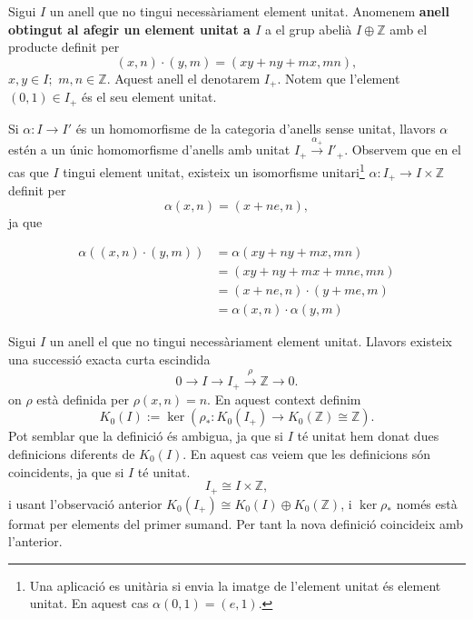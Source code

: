 \begin{definition}
Sigui $I$ un anell que no tingui necessàriament element unitat. Anomenem \textbf{anell obtingut al afegir un element unitat a $I$} a el grup abelià $I \oplus \mathbb{Z}$ amb el producte definit per 
$$
(x,n)\cdot (y,m) = (xy+ny+mx, mn),
$$
$x,y \in I;$ $m,n\in \mathbb{Z}$. Aquest anell el denotarem $I_+$. Notem que l'element $(0,1)\in I_+$ és el seu element unitat.
\end{definition}

\begin{obs}

Si $\alpha :  I \rightarrow I'$ és un homomorfisme de la categoria d'anells sense unitat, llavors $\alpha$ estén a un únic homomorfisme d'anells amb unitat $I_+ \xrightarrow{\alpha_+}I'_+$. 
Observem que en el cas que $I$ tingui element unitat, existeix un isomorfisme unitari\footnote{Una aplicació es unitària si envia la imatge de l'element unitat és element unitat. En aquest cas $\alpha (0,1) = (e,1)$.} $\alpha: I_+ \rightarrow I \times \mathbb{Z}$ definit per
$$
\alpha (x,n) = (x+ne, n),
$$
ja que 

\begin{align*} 
\alpha((x,n)\cdot (y,m)) &= \alpha(xy+ny+mx, mn) \\
&=(xy+ny+mx+mne,mn)\\
&=(x+ne,n) \cdot (y+me, m) \\
&=\alpha (x,n) \cdot \alpha (y,m)
\end{align*}

\end{obs}


\begin{definition}
Sigui $I$ un anell el que no tingui necessàriament element unitat. Llavors existeix una successió exacta curta escindida
\begin{equation} \label{suc}
0 \rightarrow I \rightarrow I_+ \xrightarrow{\rho} \mathbb{Z} \rightarrow 0.
\end{equation}
on $\rho$ està definida per $\rho(x,n)=n$. En aquest context definim
$$
K_0(I):=\ker (\rho_*: K_0(I_+)\rightarrow K_0(\mathbb{Z})\cong \mathbb{Z}).
$$
Pot semblar que la definició és ambigua, ja que si $I$ té unitat hem donat dues definicions diferents de $K_0(I)$. En aquest cas veiem que les definicions són coincidents, ja que si $I$ té unitat. $$I_+ \cong I \times \mathbb{Z},$$ i usant l'observació anterior $K_0(I_+) \cong K_0(I) \oplus K_0(\mathbb{Z})$, i $\ker \rho_*$ només està format per elements del primer sumand. Per tant la nova definició coincideix amb l'anterior.
\end{definition}


